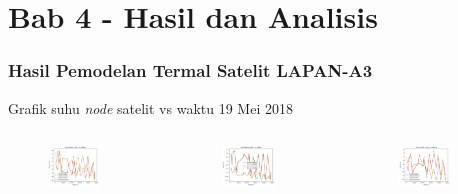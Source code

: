 \documentclass[8pt]{beamer}
\begin{document}
\section{Bab 4 - Hasil dan Analisis}
\begin{frame}
  \frametitle{Hasil Pemodelan Termal Satelit LAPAN-A3}
  \center Grafik suhu \textit{node} satelit vs waktu 19 Mei 2018
  \begin{columns}[T]
      \begin{figure}
          \includegraphics[width=0.7\textwidth]{figure/paper_node12_temp_2018-05-19.png}
      \end{figure}
      \begin{figure}
          \includegraphics[width=0.7\textwidth]{figure/paper_node34_temp_2018-05-19.png}
      \end{figure}
      \begin{figure}
          \includegraphics[width=0.7\textwidth]{figure/paper_node56_temp_2018-05-19.png}

\end{figure}
\end{columns}
\end{frame}
\end{document}
